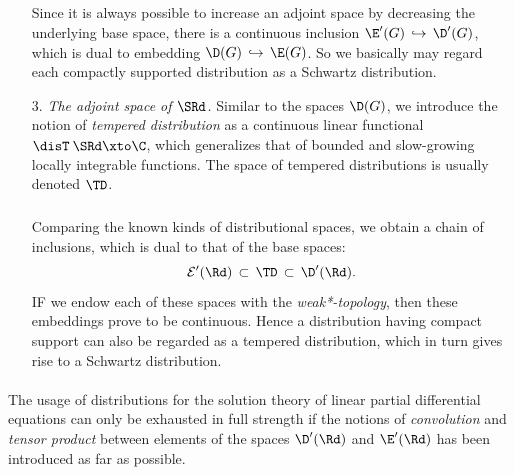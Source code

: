 \documentclass[11pt,twoside]{article}
\def\G{G}
\begin{document}
\begin{itemize}[leftmargin=12pt,itemsep=5pt]
\subparagraph{}
Since it is always possible to increase an adjoint space
by decreasing the underlying base space,
there is a continuous inclusion $\E'(\G) \, \hookrightarrow \, \D'(\G)$,
which is dual to embedding
$\D(\G) \, \hookrightarrow \, \E(\G)$.
So we basically may regard
each compactly supported distribution as a Schwartz distribution.

\item[3.] \textit{The adjoint space of $\SRd$.}
Similar to the spaces $\D(\G)$,
we introduce the notion of \textit{tempered distribution}
as a continuous linear functional $\disT \: \SRd \xto \C$,
which generalizes that of bounded and slow-growing locally integrable functions.
The space of tempered distributions is usually denoted $\TD$.

\subparagraph{} %
Comparing the known kinds of distributional spaces,
we obtain a chain of inclusions,
which is dual to that of the base spaces:
\[
\cal{E}'(\Rd) \, \subset \, \TD \, \subset \, \D'(\Rd).
\]
IF we endow each of these spaces with the \textit{weak*-topology},
then these embeddings prove to be continuous.
Hence a distribution having compact support can also be regarded
as a tempered distribution,
which in turn gives rise to a Schwartz distribution.
\end{itemize}

\paragraph{} %
The usage of distributions for the solution theory of linear partial
differential equations can only be exhausted in full strength
if the notions of \textit{convolution} and \textit{tensor product}
between elements of the spaces $\D'(\Rd)$ and $\E'(\Rd)$ has been introduced
as far as possible.
\end{document}
